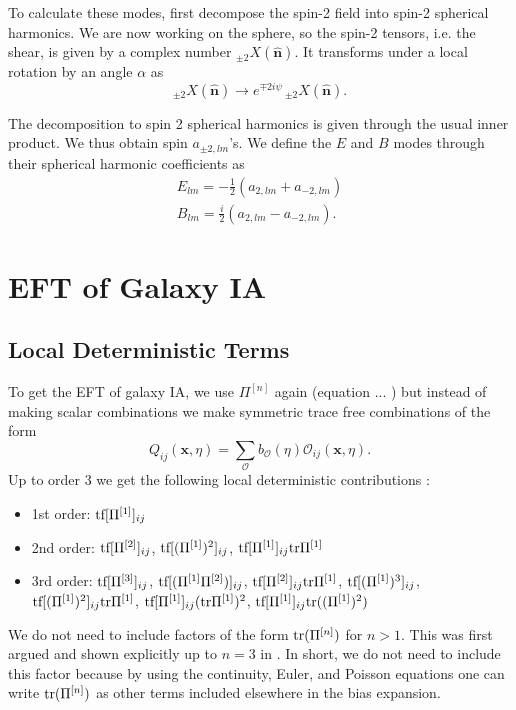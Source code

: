 \documentclass[11pt]{book}
\DeclareRobustCommand{\tr}{\ifmmode\text{tr}\else d\fi}
\DeclareRobustCommand{\tf}{\ifmmode\text{tf}\else d\fi}
\newcommand{\br}[1]{\ensuremath{\left( #1 \right)}}
\begin{document}
To calculate these modes, first decompose the spin-2 field into spin-2 spherical harmonics. We are now working on the sphere, so the spin-2 tensors, i.e. the shear, is given by a complex number $_{\pm 2} X(\hat {\mathbf n})$. It transforms under a local rotation by an angle $\alpha$ as 
\begin{equation}
    _{\pm 2}X(\hat{\mathbf n}) \rightarrow e^{\mp 2i\psi} \,_{\pm 2}X(\hat{\mathbf n}).
\end{equation}

The decomposition to spin 2 spherical harmonics is given through the usual inner product. We thus obtain spin $a_{\pm 2,lm}$'s. We define the $E$ and $B$ modes through their spherical harmonic coefficients as
\begin{gather}
    E_{lm} = -\frac{1}{2}\br{a_{2,lm} + a_{-2,lm}}\\
    B_{lm} = \frac{i}{2}\br{a_{2,lm} - a_{-2,lm}}.
\end{gather}


\section{EFT of Galaxy IA}
\label{sec:galaxyintrinsicalignment}
\subsection{Local Deterministic Terms}
To get the EFT of galaxy IA, we use $\Pi^{[n]}$ again (equation ... %
) but instead of making scalar combinations we make symmetric trace free combinations of the form
\begin{equation}
    Q_{ij}(\mathbf x, \eta) = \sum_{\mathcal O}b_{\mathcal O}(\eta)\mathcal O_{ij}(\mathbf x, \eta).
    \label{eq:shapebiasdeterministic}
\end{equation}
Up to order 3 we get the following local deterministic contributions \cite{Vlah_2020}:
\begin{itemize}
    \item[] 1st order: $\tf[\Pi^{[1]}]_{ij}$ 
    \item[] 2nd order: $\tf[\Pi^{[2]}]_{ij}$, $\tf[(\Pi^{[1]})^{2}]_{ij}$, $\tf[\Pi^{[1]}]_{ij}\tr \Pi^{[1]}$
    \item[] 3rd order: $\tf[\Pi^{[3]}]_{ij}$, $\tf[(\Pi^{[1]}\Pi^{[2]})]_{ij}$, $\tf[\Pi^{[2]}]_{ij}\tr \Pi^{[1]}$, $\tf[(\Pi^{[1]})^{3}]_{ij}$, $\tf[(\Pi^{[1]})^{2}]_{ij}\tr \Pi^{[1]}$, $\tf[\Pi^{[1]}]_{ij}(\tr \Pi^{[1]})^2$, $\tf[\Pi^{[1]}]_{ij}\tr ((\Pi^{[1]})^2)$
\end{itemize}
We do not need to include factors of the form $\tr(\Pi^{[n]})$ for $n>1$. This was first argued and shown explicitly up to $n=3$ in \cite{Mirbabayi_2015}. In short, we do not need to include this factor because by using the continuity, Euler, and Poisson equations one can write $\tr(\Pi^{[n]})$ as other terms included elsewhere in the bias expansion.
\end{document}
